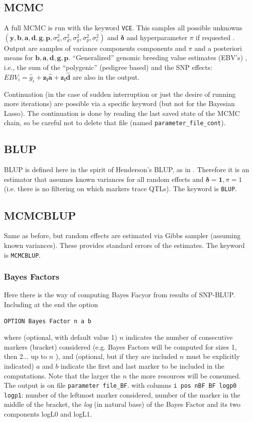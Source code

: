 \documentclass[a4paper,12pt,titlepage]{article}      %
\newcommand{\bsr}{\mathbf} %
\newcommand{\bsi}{\boldsymbol} %
\begin{document}
\subsection{MCMC}
A full MCMC is run with the keyword \verb|VCE|. This samples all possible unknowns  $(\bsr{y},\bsr{b},\bsr{a},\bsr{d},\bsr{g}, \bsr{p}, %
 \sigma^2_a,\sigma^2_d,\sigma^2_g,\sigma^2_p,\sigma^2_e)$ 
 and $\bsi{\delta}$ and hyperparameter $\pi$ if requested
 . Output are samples of variance components components 
 and $\pi$ 
 and a posteriori means for $\bsr{b},\bsr{a},\bsr{d},\bsr{g}, \bsr{p}$. ``Generalized'' genomic breeding value estimates (EBV's) , i.e., the sum of the  ``polygenic'' (pedigree based) and the SNP effects: $EBV_i = \hat{g}_i + \bsr{z_i\hat{a}} + \bsr{z_i\hat{d}}$ are also in the output.

Continuation (in the case of sudden interruption or just the desire of running more iterations) are possible via a specific keyword (but not for the Bayesian Lasso). The continuation is done by reading the last saved state of the MCMC chain, so be careful not to delete that file (named \verb|parameter_file_cont|).

\subsection{BLUP}
BLUP is defined here in the spirit of Henderson's BLUP, as in \cite{Meuwissen2001a}. Therefore it is an estimator that assumes known variances for all random effects
and $\bsi{\delta} = \bsr{1},\pi=1$ (i.e. there is no filtering on which markers trace QTLs). 
The keyword is \verb|BLUP|.

\subsection{MCMCBLUP}
Same as before, but random effects are estimated via Gibbs sampler (assuming known variances). These provides standard errors of the estimates.
The keyword is \verb|MCMCBLUP|.

\subsubsection{Bayes Factors}
Here there is the way of computing Bayes Facyor from results of SNP-BLUP. Including at the end the option 
\begin{verbatim}
OPTION Bayes Factor n a b
\end{verbatim}

where (optional, with default value 1) $n$ indicates the number of consecutive markers (bracket) considered (e.g. Bayes Factors will be computed for sizes 1, then 2... up to $n$ ), and (optional, but if they are included $n$ must be explicitly indicated) $a$ and $b$ indicate the first and last marker to be included in the computations. Note that the larger the $n$ the more resources will be consumed. The output is on file  \mbox{\texttt{parameter file\_BF}}. with columns \verb|i pos nBF BF logp0 logp1|: number of the leftmost marker considered, number of the marker in the middle of the bracket, the \emph{log} (in natural base) of the Bayes Factor and its two components logL0 and logL1.
\end{document}
